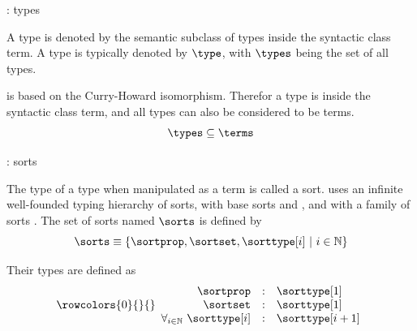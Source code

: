 \begin{frame}{\pcic: types}
	\begin{definition}[type]
		A type is denoted by the semantic subclass of types inside the syntactic class term.
		A type is typically denoted by $\type$, with $\types$ being the set of all types.
	\end{definition}
	\bigskip
	\begin{lemma}
	\coq is based on the Curry-Howard isomorphism.
	Therefor a type is inside the syntactic class term, and all types can also be considered to be terms.
	\[ \types \subseteq \terms \]
	\end{lemma}
\end{frame}

\begin{frame}{\pcic: sorts}
	\begin{definition}[sort]
		The type of a type when manipulated as a term is called a sort.
		\pcic uses an infinite well-founded typing hierarchy of sorts,
		with base sorts \sortprop and \sortset,
		and with a family of sorts \sorttype[{i}].
		The set of sorts named $\sorts$ is defined by
		\[\sorts \equiv \{ \sortprop, \sortset, \sorttype[{i}] ~|~ i \in \mathbb{N} \} \]
	
		Their types are defined as
		\[
			\rowcolors{0}{}{}
			\begin{array}{rcl}
				\sortprop & : & \sorttype[1] \\
				\sortset & : & \sorttype[1] \\
				\forall_{i \in \mathbb{N}}~ \sorttype[i] & : & \sorttype[{i+1}]
			\end{array}
		\]
	\end{definition}
\end{frame}


